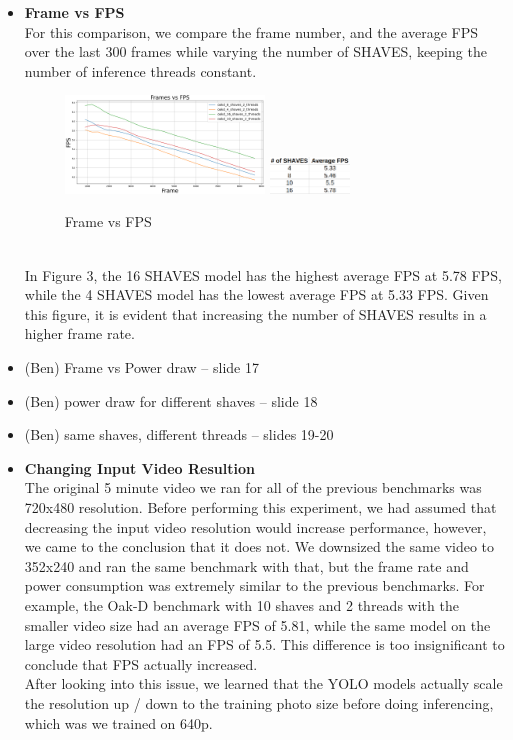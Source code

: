 \documentclass[sigconf,authorversion,nonacm]{acmart}
\begin{document}
\begin{itemize}
    \item \textbf{Frame vs FPS} \\ For this comparison, we compare the frame number, and the average FPS over the last 300 frames while varying the number of SHAVES, keeping the number of inference threads constant.
    \begin{figure}[h] %
        \centering
        \includegraphics[width=0.5\textwidth]{figures/shavesvfps.png}
        \includegraphics[width=0.2\textwidth]{figures/shavesvfpstable.png}
        \caption{Frame vs FPS}
        \label{fig:your_label}
    \end{figure}
    \\ In Figure 3, the 16 SHAVES model has the highest average FPS at 5.78 FPS, while the 4 SHAVES model has the lowest average FPS at 5.33 FPS. Given this figure, it is evident that increasing the number of SHAVES results in a higher frame rate.
    \item (Ben) Frame vs Power draw -- slide 17
    \item (Ben) power draw for different shaves -- slide 18
    \item (Ben) same shaves, different threads -- slides 19-20
    \item \textbf{Changing Input Video Resultion} \\
    The original 5 minute video we ran for all of the previous benchmarks was 720x480 resolution. Before performing this experiment, we had assumed that decreasing the input video resolution would increase performance, however, we came to the conclusion that it does not. We downsized the same video to 352x240 and ran the same benchmark with that, but the frame rate and power consumption was extremely similar to the previous benchmarks. For example, the Oak-D benchmark with 10 shaves and 2 threads with the smaller video size had an average FPS of 5.81, while the same model on the large video resolution had an FPS of 5.5. This difference is too insignificant to conclude that FPS actually increased.\\ After looking into this issue, we learned that the YOLO models actually scale the resolution up / down to the training photo size before doing inferencing, which was we trained on 640p.
\end{itemize}
\end{document}
